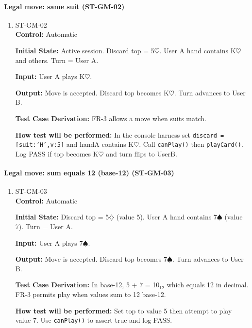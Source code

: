 \documentclass[12pt, titlepage]{article}
\begin{document}
\paragraph{Legal move: same suit (ST-GM-02)}
\begin{enumerate}
\item{ST-GM-02\\}
\textbf{Control:} Automatic

\textbf{Initial State:} Active session. Discard top = 5$\heartsuit$. User A hand contains K$\heartsuit$ and others. Turn = User A.

\textbf{Input:} User A plays K$\heartsuit$.

\textbf{Output:} Move is accepted. Discard top becomes K$\heartsuit$. Turn advances to User B.

\textbf{Test Case Derivation:} FR-3 allows a move when suits match.

\textbf{How test will be performed:} In the console harness set \texttt{discard = [{suit:'H',v:5}]} and handA contains K$\heartsuit$. Call \texttt{canPlay()} then \texttt{playCard()}. Log PASS if top becomes K$\heartsuit$ and turn flips to UserB.
\end{enumerate}

\paragraph{Legal move: sum equals 12 (base-12) (ST-GM-03)}
\begin{enumerate}
\item{ST-GM-03\\}
\textbf{Control:} Automatic

\textbf{Initial State:} Discard top = 5$\diamondsuit$ (value 5). User A hand contains 7$\spadesuit$ (value 7). Turn = User A.

\textbf{Input:} User A plays 7$\spadesuit$.

\textbf{Output:} Move is accepted. Discard top becomes 7$\spadesuit$. Turn advances to User B.

\textbf{Test Case Derivation:} In base-12, 5 + 7 = 10$_{12}$ which equals 12 in decimal. FR-3 permits play when values sum to 12 base-12.

\textbf{How test will be performed:} Set top to value 5 then attempt to play value 7. Use \texttt{canPlay()} to assert true and log PASS.
\end{enumerate}
\end{document}
